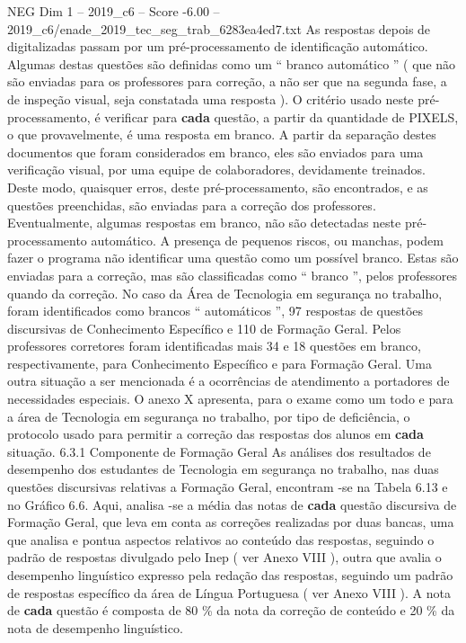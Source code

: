 \begin{textsample}{NEG Dim 1 – 2019\_c6 – Score -6.00 – 2019\_c6/enade\_2019\_tec\_seg\_trab\_6283ea4ed7.txt}
As respostas depois de digitalizadas passam por um pré-processamento de identificação automático.
Algumas destas questões são definidas como um “ branco automático ” ( que não são enviadas para os professores para correção, a não ser que na segunda fase, a de inspeção visual, seja constatada uma resposta ).
O critério usado neste pré-processamento, é verificar para \textbf{cada} questão, a partir da quantidade de PIXELS, o que provavelmente, é uma resposta em branco.
A partir da separação destes documentos que foram considerados em branco, eles são enviados para uma verificação visual, por uma equipe de colaboradores, devidamente treinados.
Deste modo, quaisquer erros, deste pré-processamento, são encontrados, e as questões preenchidas, são enviadas para a correção dos professores.
Eventualmente, algumas respostas em branco, não são detectadas neste pré-processamento automático.
A presença de pequenos riscos, ou manchas, podem fazer o programa não identificar uma questão como um possível branco.
Estas são enviadas para a correção, mas são classificadas como “ branco ”, pelos professores quando da correção.
No caso da Área de Tecnologia em segurança no trabalho, foram identificados como brancos “ automáticos ”, 97 respostas de questões discursivas de Conhecimento Específico e 110 de Formação Geral.
Pelos professores corretores foram identificadas mais 34 e 18 questões em branco, respectivamente, para Conhecimento Específico e para Formação Geral.
Uma outra situação a ser mencionada é a ocorrências de atendimento a portadores de necessidades especiais.
O anexo X apresenta, para o exame como um todo e para a área de Tecnologia em segurança no trabalho, por tipo de deficiência, o protocolo usado para permitir a correção das respostas dos alunos em \textbf{cada} situação. 6.3.1 Componente de Formação Geral As análises dos resultados de desempenho dos estudantes de Tecnologia em segurança no trabalho, nas duas questões discursivas relativas a Formação Geral, encontram -se na Tabela 6.13 e no Gráfico 6.6.
Aqui, analisa -se a média das notas de \textbf{cada} questão discursiva de Formação Geral, que leva em conta as correções realizadas por duas bancas, uma que analisa e pontua aspectos relativos ao conteúdo das respostas, seguindo o padrão de respostas divulgado pelo Inep ( ver Anexo VIII ), outra que avalia o desempenho linguístico expresso pela redação das respostas, seguindo um padrão de respostas específico da área de Língua Portuguesa ( ver Anexo VIII ).
A nota de \textbf{cada} questão é composta de 80 \% da nota da correção de conteúdo e 20 \% da nota de desempenho linguístico.

\end{textsample}
